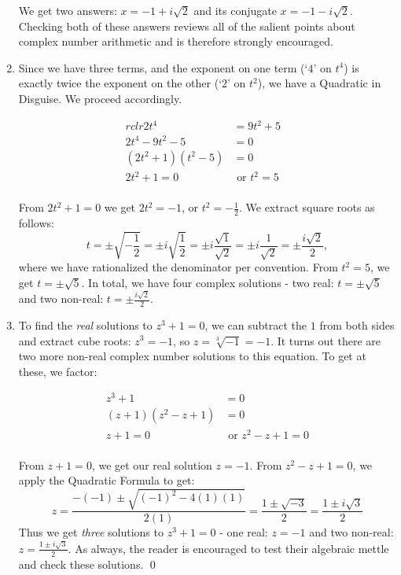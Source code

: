 \begin{ex}
\begin{enumerate}
We get two answers: $x = -1 + i\sqrt{2}$ and its conjugate $x = -1 - i\sqrt{2}$.  Checking both of these answers reviews all of the salient points about complex number arithmetic and is therefore strongly encouraged.

\item  Since we have three terms, and the exponent on one term (`$4$' on $t^4$) is exactly twice the exponent on the other (`$2$' on $t^2$), we have a Quadratic in Disguise.  We proceed accordingly.

\begin{align*}{rclr}
2t^4 & = 9t^2 + 5 & \\
2t^4 - 9t^2 - 5 & = 0 & \tag{Subtract $9t^2$ and $5$} \\
(2t^2 + 1)(t^2 - 5) & = 0 & \tag{Factor} \\
2t^2 + 1 = 0 & \text{ or } t^2 = 5 \tag{Zero Product Property} \\
\end{align*}

From $2t^2 + 1 = 0$ we get $2t^2 = -1$, or $t^2 = -\frac{1}{2}$.  We extract square roots as follows: \[ t = \pm \sqrt{-\dfrac{1}{2}} = \pm i \sqrt{\dfrac{1}{2}} = \pm i \dfrac{\sqrt{1}}{\sqrt{2}} = \pm i \dfrac{1}{\sqrt{2}} = \pm \dfrac{i \sqrt{2}}{2},\]
where we have rationalized the denominator per convention.  From $t^2 = 5$, we get $t = \pm \sqrt{5}$. In total, we have four complex solutions - two real: $t = \pm \sqrt{5}$ and two non-real: $t = \pm \frac{i \sqrt{2}}{2}$.

\item To find  the \textit{real} solutions to  $z^3 + 1 = 0$, we can subtract the $1$ from both sides and extract cube roots: $z^3 = -1$, so $z  = \sqrt[3]{-1} = -1$.  It turns out there are two more non-real complex number solutions to this equation.  To get at these, we factor:

\begin{align*}
z ^ 3 + 1 & = 0 \\
(z + 1)(z^2 - z + 1) & = 0 \tag{Factor\textemdash Sum of Two Cubes} \\
z + 1 = 0 & \text{ or } z^2 - z + 1 = 0 \\
\end{align*}

From $z+1 = 0$, we get our real solution $z = -1$.  From $z^2 -z + 1 = 0$, we apply the Quadratic Formula to get: \[z = \dfrac{-(-1) \pm \sqrt{(-1)^2 - 4(1)(1)}}{2(1)} = \dfrac{1 \pm \sqrt{-3}}{2} = \dfrac{1 \pm i\sqrt{3}}{2} \]
Thus we get \textit{three} solutions to $z^3 + 1 = 0$ - one real: $z = -1$ and two non-real: $z =  \frac{1 \pm i\sqrt{3}}{2}$.  As always, the reader is encouraged to test their algebraic mettle and check these solutions. \qed
		
\end{enumerate}


\end{ex}

